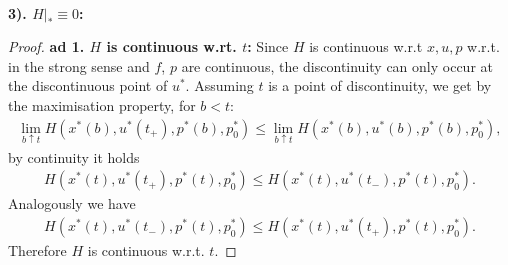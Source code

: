 \documentclass[a4paper,11pt,fleqn]{book}
\theoremstyle{definition}
\theoremstyle{remark}
\begin{document}
\quad\\
\textbf{3). $H|_* \equiv 0$:}
\begin{proof}
\textbf{ad 1. $H$ is continuous w.rt. $t$:} Since $H$ is continuous w.r.t $x, u, p$ w.r.t. in the strong sense and $f$, $p$ are continuous, the discontinuity can only occur at the discontinuous point of $u^*$. Assuming $t$ is a point of discontinuity, we get by the maximisation property, for $b < t$:
\begin{align*}
	\lim_{b \uparrow t} H(x^*(b), u^*(t_+), p^*(b), p_0^*) \le \lim_{b \uparrow t}H(x^*(b), u^*(b), p^*(b), p_0^*), 
\end{align*}
by continuity it holds
\begin{align*}
	H(x^*(t), u^*(t_+), p^*(t), p_0^*) \le H(x^*(t), u^*(t_-), p^*(t), p_0^*).
\end{align*}
Analogously we have
\begin{align*}
	H(x^*(t), u^*(t_-), p^*(t), p_0^*) \le H(x^*(t), u^*(t_+), p^*(t), p_0^*).
\end{align*}
Therefore $H$ is continuous w.r.t. $t$.


\end{proof}
\end{document}
